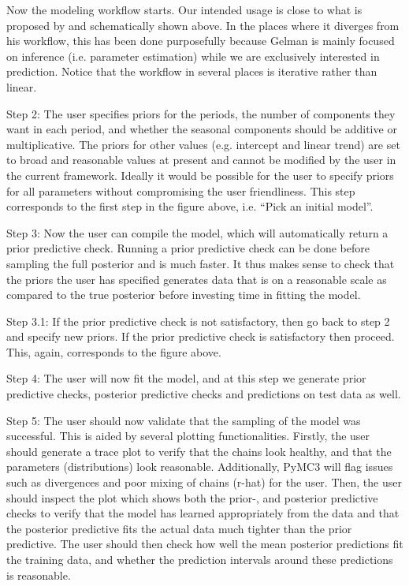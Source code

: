 \documentclass{article}
\begin{document}
\noindent Now the modeling workflow starts. Our intended usage is close to what is proposed by  and schematically shown above. In the places where it diverges from his workflow, this has been done purposefully because Gelman is mainly focused on inference (i.e. parameter estimation) while we are exclusively interested in prediction. Notice that the workflow in several places is iterative rather than linear.

\noindent Step 2: The user specifies priors for the periods, the number of components they want in each period, and whether the seasonal components should be additive or multiplicative. The priors for other values (e.g. intercept and linear trend) are set to broad and reasonable values at present and cannot be modified by the user in the current framework. Ideally it would be possible for the user to specify priors for all parameters without compromising the user friendliness. This step corresponds to the first step in the figure above, i.e. “Pick an initial model”. 

\noindent Step 3: Now the user can compile the model, which will automatically return a prior predictive check. Running a prior predictive check can be done before sampling the full posterior and is much faster. It thus makes sense to check that the priors the user has specified generates data that is on a reasonable scale as compared to the true posterior before investing time in fitting the model.

\noindent Step 3.1: If the prior predictive check is not satisfactory, then go back to step 2 and specify new priors. If the prior predictive check is satisfactory then proceed. This, again, corresponds to the figure above.

\noindent Step 4: The user will now fit the model, and at this step we generate prior predictive checks, posterior predictive checks and predictions on test data as well. 

\noindent Step 5: The user should now validate that the sampling of the model was successful. This is aided by several plotting functionalities. Firstly, the user should generate a trace plot to verify that the chains look healthy, and that the parameters (distributions) look reasonable. Additionally, PyMC3 will flag issues such as divergences and poor mixing of chains (r-hat) for the user. Then, the user should inspect the plot which shows both the prior-, and posterior predictive checks to verify that the model has learned appropriately from the data and that the posterior predictive fits the actual data much tighter than the prior predictive. The user should then check how well the mean posterior predictions fit the training data, and whether the prediction intervals around these predictions is reasonable. 
\end{document}
